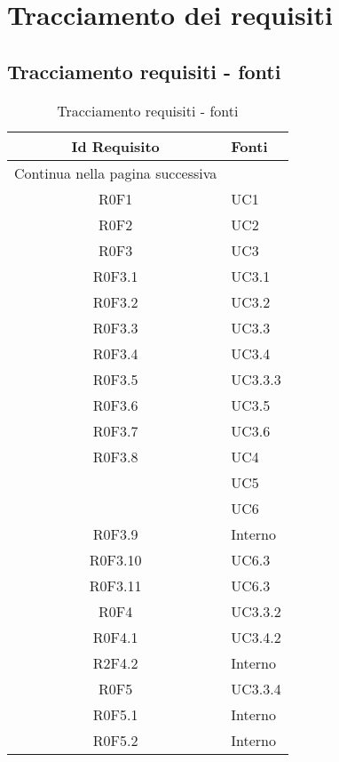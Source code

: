 \section{Tracciamento dei requisiti}

\subsection{Tracciamento requisiti - fonti}

\begin{center}
    \renewcommand{\arraystretch}{2.2}
    
    \begin{longtable}{ c m{3cm} }
        
        \rowcolor[HTML]{232f3e}
    
        \rowcolors{3}{tableRow}{}
        \color[HTML]{FFFFFF} \textbf{Id Requisito} & \color[HTML]{FFFFFF} \textbf{Fonti} \\
    \endhead
    \rowcolor{white}\multicolumn{2}{c}
   { Continua nella pagina successiva} \\
   \endfoot
   \caption [Tracciamento requisiti - fonti]{Tracciamento requisiti - fonti}
	\label{tabella:TracReqF}
   \endlastfoot
   R0F1 & UC1 \\ 
   R0F2 & UC2\\ 
   R0F3 & UC3\\
   R0F3.1 & UC3.1 \\ 
   R0F3.2 & UC3.2 \\
   R0F3.3 & UC3.3 \\
   R0F3.4 & UC3.4 \\
   R0F3.5 & UC3.3.3 \\
   R0F3.6 & UC3.5 \\
   R0F3.7 & UC3.6 \\
   R0F3.8 & UC4\\
   \rowcolor{tableRow}& UC5\\
   & UC6 \\
   R0F3.9 & Interno \\
   R0F3.10 & UC6.3 \\
   R0F3.11 & UC6.3 \\
   R0F4 & UC3.3.2 \\
   R0F4.1 & UC3.4.2 \\
   R2F4.2 & Interno \\
   R0F5 & UC3.3.4 \\
   R0F5.1 & Interno \\
   R0F5.2 & Interno \\

\end{longtable}
\end{center}
